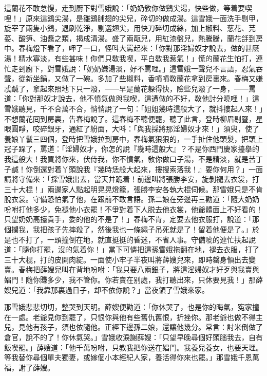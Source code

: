 這蘭花不敢怠慢，走到厨下對雪娥說：「奶奶敎你做鷄尖湯，快些做，等着要喫哩！」原來這鷄尖湯，是雛鷄脯翅的尖兒，碎切的做成湯。這雪娥一面洗手剔甲，旋宰了兩隻小鷄，退刷乾淨，剔選翅尖，用快刀碎切成絲，加上椒料、葱花、芫荽、酸笋、油醬之類，揭成清湯。盛了兩甌兒，用紅漆盤兒，熱騰騰，蘭花㧱到房中。春梅燈下看了，呷了一口，怪呌大罵起來：「你對那淫婦奴才說去，做的甚麽湯！精水寡淡，有些甚味！你們只敎我喫，平白敎我惹氣！」慌的蘭花生怕打，連忙走到廚下，對雪娥說：「奶奶嫌湯淡，好不罵哩。」這雪娥一聲兒不言語，忍氣吞聲，從新坐鍋，又做了一碗。多加了些椒料，香噴噴敎蘭花拿到房裏來。春梅又嫌忒鹹了，拿起來照地下只一潑，——早是蘭花躱得快，險些兒潑了一身，——罵道：「你對那奴才說去，他不憤氣做與我喫，這遭做的不好，敎他討分曉哩！」這雪娥聽見，千不合萬不合，悄悄說了一句：「姐姐幾時這般大了，就抖摟起人來！」不想蘭花囘到房裏，告春梅說了。這春梅不聽便罷，聽了此言，登時柳眉剔豎，星眼圓睜，咬碎銀牙，通紅了紛面，大呌：「與我採將那淫婦奴才來！」須臾，使了養娘丫鬟三四個，登時把雪娥拉到房中，春梅氣狠狠的，一手扯住他頭髮，把頭上冠子跺了，罵道：「淫婦奴才，你怎的說『幾時這般大』？不是你西門慶家擡擧的我這般大！我買將你來，伏侍我，你不憤氣，敎你做口子湯，不是精淡，就是苦丁子鹹！你倒還對着丫頭說我『幾時恁般大起來，摟搜索落我！』要你何用？」一面請將守備來：「採雪娥出去，當天井跪着！前邊叫將張勝李安，旋剝褪去衣裳，打三十大棍！」兩邊家人點起明晃晃燈籠，張勝李安各執大棍伺候。那雪娥只是不肯脫衣裳。守備恐怕氣了他，在跟前不敢言語。孫二娘在旁邊再三勸道：「隨大奶奶吩咐打他多少，免褪他小衣罷！不爭對着下人脱去他衣裳，他爺體面上不好看的！只望奶奶高擡貴手，委的他的不是了！」春梅不肯，定要去他衣服打，說道：「那個攔我，我把孩子先摔殺了，然後我也一條繩子吊死就是了！留着他便是了。」於是也不打了，一頭撞倒在地，就直挺挺的昏迷，不省人事。守備唬的連忙扶起說道：「隨你打罷，沒的氣着你！」當下可憐把這孫雪娥拖翻在地，褪去衣服，打了三十大棍，打的皮開肉綻。一面使小牢子半夜叫將薛嫂兒來，即時罄身領出去變賣。春梅把薛嫂兒叫在背地吩咐：「我只要八兩銀子，將這淫婦奴才好歹與我賣與娼門！隨你賺多少，我不管你。你若賣在别處，我打聽出來，只休要見我！」那薛嫂兒道：「我靠那裏過日子，却不依你說？」當夜領了雪娥來家。

那雪娥悲悲切切，整哭到天明。薛嫂便勸道：「你休哭了，也是你的晦氣，寃家撞在一處。老爺見你到罷了，只恨你與他有些舊仇舊恨，折挫你。那老爺也做不得主兒，見他有孩子，須也依隨他。正經下邊孫二娘，還讓他幾分。常言：討米倒做了倉官，說不的了！你休氣哭。」雪娥收淚謝薛嫂：「只望早晚尋個好頭腦我去，自有飯喫罷。」薛嫂道：「他千萬吩咐，只教我把你送在娼門。我養兒養女，也要天理。等我替你尋個單夫獨妻，或嫁個小本經紀人家，養活得你來也罷。」那雪娥千恩萬福，謝了薛嫂。

